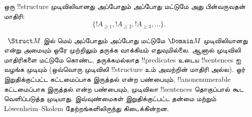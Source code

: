 \documentclass[../../../include/open-logic-section]{subfiles}
\begin{document}
\begin{prop}
ஒரு !!{structure} முடிவிலியானது அப்போதும் அப்போது மட்டுமே அது பின்வருவதன் மாதிரி:
\[
\{!A_{\ge 1}, !A_{\ge 2}, !A_{\ge 3}, \dots \}.
\]
\end{prop}

~$\Struct M$ இல் மெய் அப்போதும் அப்போது மட்டுமே $\Domain M$ முடிவிலியானது என்று அமையும்
ஒரே முற்றிலும் தருக்க வாக்கியம் எதுவுமில்லை. ஆனால் முடிவிலி மாதிரிகளை
மட்டுமே கொண்ட, தருக்கமல்லாத !!{predicate}s உடைய !!{sentence}s ஐ வழங்க
முடியும் (ஒவ்வொரு முடிவிலி !!{structure} உம் அவற்றின் மாதிரி அல்ல).
ஓர் இறுதிக்குட்பட்ட கட்டமைப்பாக இருத்தல் என்ற பண்பையும்,
!!a{nonenumerable} கட்டமைப்பாக இருத்தல் என்ற பண்பையும், முடிவிலா
!!{sentence}s தொகுப்பால் கூட வெளிப்படுத்த முடியாது. இவ்வுண்மைகள்
இறுதிக்குட்பட்ட தன்மை மற்றும் L\"owenheim--Skolem தேற்றங்களிலிருந்து
கிடைக்கின்றன.
\end{document}
